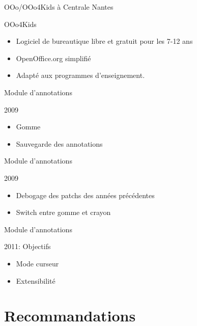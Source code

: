 \documentclass[hyperref,french,usenames,xcolor=dvipsnames]{beamer}
\begin{document}
\begin{frame}{OOo/OOo4Kids à Centrale Nantes}
    \begin{block}{OOo4Kids}
	\begin{itemize}[<+->]
	    \item Logiciel de bureautique libre et gratuit pour les 7-12 ans
	    \item OpenOffice.org simplifié
	    \item Adapté aux programmes d'enseignement.
	\end{itemize}
    \end{block}
\end{frame}

\begin{frame}{Module d'annotations}
    \begin{block}{2009}
        \begin{itemize}[<+->]
            \item Gomme
	    \item Sauvegarde des annotations
        \end{itemize}
    \end{block}
\end{frame}

\begin{frame}{Module d'annotations}
    \begin{block}{2009}
        \begin{itemize}[<+->]
            \item Debogage des patchs des années précédentes
	    \item Switch entre gomme et crayon
        \end{itemize}
    \end{block}
\end{frame}

\begin{frame}{Module d'annotations}
    \begin{block}{2011: Objectifs}
        \begin{itemize}[<+->]
            \item Mode curseur
            \item Extensibilité
        \end{itemize}
    \end{block}
\end{frame}

\section{Recommandations}
\end{document}
